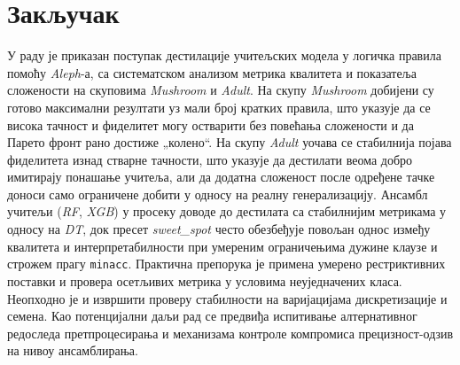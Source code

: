 \section{Закључак}
У раду је приказан поступак дестилације учитељских модела у логичка правила помоћу \emph{Aleph}-а, са систематском анализом метрика квалитета и показатеља сложености на скуповима \emph{Mushroom} и \emph{Adult}. На скупу \emph{Mushroom} добијени су готово максимални резултати уз мали број кратких правила, што указује да се висока тачност и фиделитет могу остварити без повећања сложености и да Парето фронт рано достиже „колено“. На скупу \emph{Adult} уочава се стабилнија појава фиделитета изнад стварне тачности, што указује да дестилати веома добро имитирају понашање учитеља, али да додатна сложеност после одређене тачке доноси само ограничене добити у односу на реалну генерализацију. Ансамбл учитељи (\emph{RF}, \emph{XGB}) у просеку доводе до дестилата са стабилнијим метрикама у односу на \emph{DT}, док пресет \textit{sweet\_spot} често обезбеђује повољан однос између квалитета и интерпретабилности при умереним ограничењима дужине клаузе и строжем прагу \texttt{minacc}. Практична препорука је примена умерено рестриктивних поставки и провера осетљивих метрика у условима неуједначених класа. Неопходно је и извршити проверу стабилности на варијацијама дискретизације и семена. Као потенцијални даљи рад се предвиђа испитивање алтернативног редоследа претпроцесирања и механизама контроле компромиса прецизност-одзив на нивоу ансамблирања.